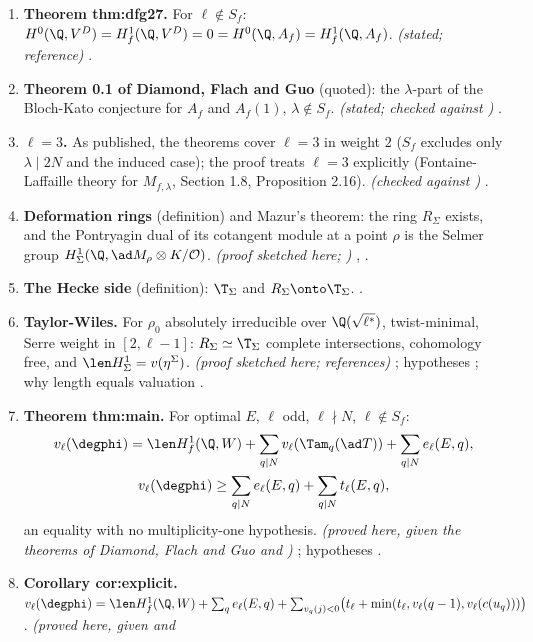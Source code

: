 \begin{enumerate}[label=\textbf{\thechapter.\arabic*}]
\item \textbf{Theorem thm:dfg27.} For $\ell\notin S_f$: $H^0(\Q,V^D)=H^1_f(\Q,V^D)=0=H^0(\Q,A_f)=H^1_f(\Q,A_f)$. \emph{(stated; reference)} .
\item \textbf{Theorem 0.1 of Diamond, Flach and Guo} (quoted): the $\lambda$-part of the Bloch-Kato conjecture for $A_f$ and $A_f(1)$, $\lambda\notin S_f$. \emph{(stated; checked against \cite{DFG04})} .
\item \textbf{$\ell=3$.} As published, the theorems cover $\ell=3$ in weight $2$ ($S_f$ excludes only $\lambda\mid2N$ and the induced case); the proof treats $\ell=3$ explicitly (Fontaine-Laffaille theory for $M_{f,\lambda}$, Section 1.8, Proposition 2.16). \emph{(checked
against \cite{DFG04})} .
\item \textbf{Deformation rings} (definition) and Mazur's theorem: the ring $R_\Sigma$ exists, and the Pontryagin dual of its cotangent module at a point $\rho$ is the Selmer group $H^1_\Sigma(\Q,\ad M_\rho\otimes K/\mathcal O)$. \emph{(proof sketched here; \cite{DDT})} ,
.
\item \textbf{The Hecke side} (definition): $\T_\Sigma$ and $R_\Sigma\onto\T_\Sigma$. .
\item \textbf{Taylor-Wiles.} For $\rho_0$ absolutely irreducible over $\Q(\sqrt{\ell^*})$, twist-minimal, Serre weight in $[2,\ell-1]$: $R_\Sigma\simeq\T_\Sigma$ complete intersections, cohomology free, and $\len H^1_\Sigma=v(\eta^\Sigma)$.
\emph{(proof sketched here; references)} ; hypotheses ; why length equals valuation .
\item \textbf{Theorem thm:main.} For optimal $E$, $\ell$ odd, $\ell\nmid N$, $\ell\notin S_f$:
\begin{gather*}
v_\ell(\degphi)=\len H^1_f(\Q,W)+\sum_{q\mid N}v_\ell(\Tam_q(\ad T))+\sum_{q\mid N}e_\ell(E,q),\\
v_\ell(\degphi)\ge\sum_{q\mid N}e_\ell(E,q)+\sum_{q\mid N}t_\ell(E,q),
\end{gather*}
an equality with no multiplicity-one hypothesis. \emph{(proved here, given the theorems of Diamond, Flach and Guo and )} ; hypotheses
.
\item \textbf{Corollary cor:explicit.} $v_\ell(\degphi)=\len H^1_f(\Q,W)+\sum_qe_\ell(E,q)+\sum_{v_q(j)<0}\bigl(t_\ell+\min(t_\ell,v_\ell(q-1),v_\ell(c(u_q)))\bigr)$. \emph{(proved here, given  and
}
\end{enumerate}
